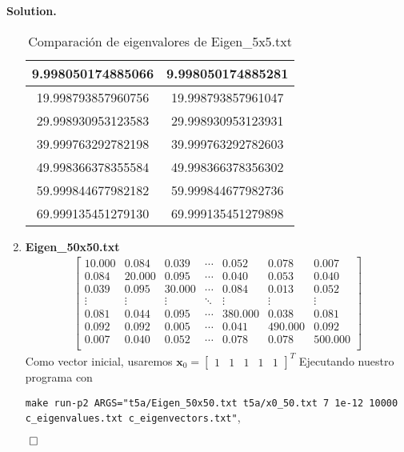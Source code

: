 \documentclass{article}
\theoremstyle{problemstyle}
\newenvironment{solution}{%
  \begin{mdframed}[linewidth=0.8pt,linecolor=Gray,backgroundcolor=Gray!5,roundcorner=5pt]%
  \noindent\textbf{Solution.}%
}{%
\hfill $ \qed $ 
  \end{mdframed}%
}
\begin{document}
\begin{solution}
\begin{enumerate}
\begin{table}[H]
\begin{center}
\begin{tabular}{|c|c|}
					      9.998050174885066  & 9.998050174885281  \\
					      \hline
					      19.998793857960756 & 19.998793857961047 \\
					      \hline
					      29.998930953123583 & 29.998930953123931 \\
					      \hline
					      39.999763292782198 & 39.999763292782603 \\
					      \hline
					      49.998366378355584 & 49.998366378356302 \\
					      \hline
					      59.999844677982182 & 59.999844677982736 \\
					      \hline
					      69.999135451279130 & 69.999135451279898 \\
					      \hline
				      \end{tabular}
			      \end{center}
			      \caption{Comparaci\'on de eigenvalores de Eigen\_5x5.txt}\label{tab:invevals5x5}
		      \end{table}
		\item \textbf{Eigen\_50x50.txt}
		      \begin{align*}
			      \begin{bmatrix}
				      10.000 & 0.084  & 0.039  & \cdots & 0.052   & 0.078   & 0.007   \\
				      0.084  & 20.000 & 0.095  & \cdots & 0.040   & 0.053   & 0.040   \\
				      0.039  & 0.095  & 30.000 & \cdots & 0.084   & 0.013   & 0.052   \\
				      \vdots & \vdots & \vdots & \ddots & \vdots  & \vdots  & \vdots  \\
				      0.081  & 0.044  & 0.095  & \cdots & 380.000 & 0.038   & 0.081   \\
				      0.092  & 0.092  & 0.005  & \cdots & 0.041   & 490.000 & 0.092   \\
				      0.007  & 0.040  & 0.052  & \cdots & 0.078   & 0.078   & 500.000 \\
			      \end{bmatrix}
		      \end{align*}
		      Como vector inicial, usaremos $ \mathbf{x}_0 = \begin{bmatrix}
				      1 & 1 & 1 & 1 & 1
			      \end{bmatrix}^{T} $
		      Ejecutando nuestro programa con
		      \begin{center}
			      \texttt{make run-p2
				      ARGS="t5a/Eigen\_50x50.txt t5a/x0\_50.txt 7 1e-12 10000 c\_eigenvalues.txt c\_eigenvectors.txt"},

\end{center}
\end{enumerate}
\end{solution}
\end{document}
